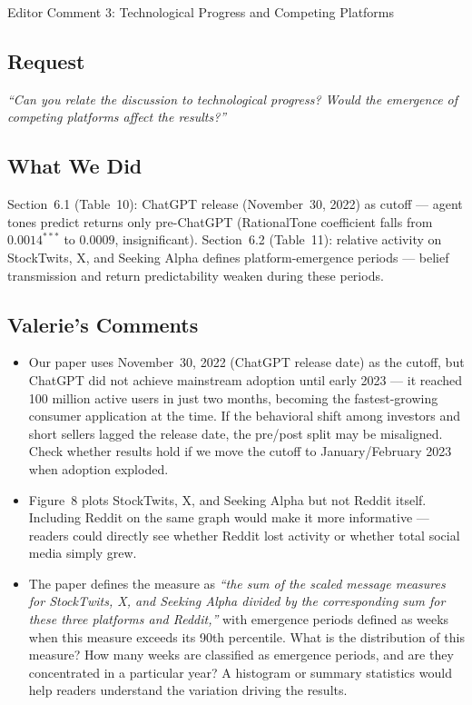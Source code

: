 \documentclass[11pt]{article}
\makeatletter
\def\section{\@ifstar\section@star\section@nostar}
\def\section@star#1{%
  \par\vspace{1.5ex}%
  \noindent{\normalsize\bfseries#1}\par%
  \vspace{0.5ex}%
  \@afterheading%
}
\def\section@nostar#1{%
  \par\vspace{1.5ex}%
  \noindent{%
    \setlength{\fboxsep}{4pt}%
    \colorbox{sectionbg}{\parbox{\dimexpr\textwidth-8pt\relax}{\normalsize\bfseries\strut#1\strut}}%
  }\par%
  \vspace{0.5ex}%
  \@afterheading%
}
\makeatother
\begin{document}
\section{Editor Comment 3: Technological Progress and Competing Platforms}

\subsection*{Request}
\begin{mdframed}
\textit{``Can you relate the discussion to technological progress? Would
the emergence of competing platforms affect the results?''}
\end{mdframed}

\subsection*{What We Did}
Section~6.1 (Table~10): ChatGPT release (November~30, 2022) as cutoff ---
agent tones predict returns only pre-ChatGPT (RationalTone coefficient falls
from $0.0014^{***}$ to $0.0009$, insignificant). Section~6.2 (Table~11):
relative activity on StockTwits, X, and Seeking Alpha defines
platform-emergence periods --- belief transmission and return predictability
weaken during these periods.

\subsection*{Valerie's Comments}
\begin{itemize}
  \item Our paper uses November~30, 2022 (ChatGPT release date) as the cutoff,
    but ChatGPT did not achieve mainstream adoption until early 2023 --- it
    reached 100 million active users in just two months, becoming the
    fastest-growing consumer application at the time. If the behavioral shift
    among investors and short sellers lagged the release date, the pre/post
    split may be misaligned. Check whether results hold if we move the cutoff
    to January/February 2023 when adoption exploded.
  \item Figure~8 plots StockTwits, X, and Seeking Alpha but not Reddit itself.
    Including Reddit on the same graph would make it more informative ---
    readers could directly see whether Reddit lost activity or whether total
    social media simply grew.
  \item The paper defines the measure as \textit{``the sum of the scaled
    message measures for StockTwits, X, and Seeking Alpha divided by the
    corresponding sum for these three platforms and Reddit,''} with emergence
    periods defined as weeks when this measure exceeds its 90th percentile.
    What is the distribution of this measure? How many weeks are classified as
    emergence periods, and are they concentrated in a particular year? A
    histogram or summary statistics would help readers understand the variation
    driving the results.
\end{itemize}
\end{document}
